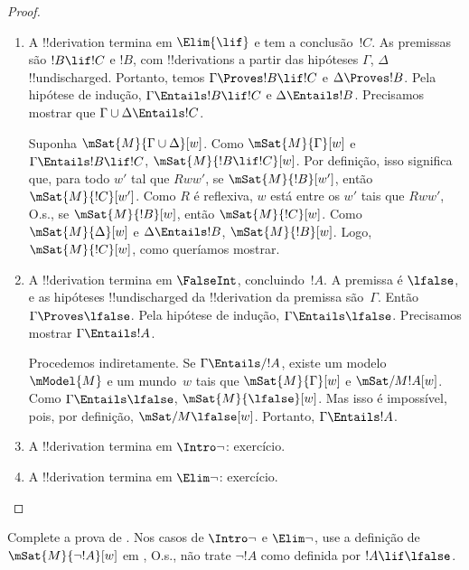 \documentclass[../../../include/open-logic-section]{subfiles}
\begin{document}
\begin{proof}
\begin{enumerate}
    Suponha $\mSat{M}{\Gamma}[w]$. Queremos mostrar que, para todo
    $w'$ tal que $Rww'$, se $\mSat{M}{!B}[w']$, então
    $\mSat{M}{!C}[w']$. Suponha, portanto, $Rww'$ e
    $\mSat{M}{!B}[w']$. Por ,
    $\mSat{M}{\Gamma}[w']$. Como $\Gamma \cup \{!B\} \Entails !C$,
    $\mSat{M}{!C}[w']$, que é o que queríamos mostrar. 

  \item A !!{derivation} termina em $\Elim{\lif}$ e tem a
    conclusão~$!C$. As premissas são $!B \lif !C$ e $!B$, com
    !!{derivation}s a partir das hipóteses $\Gamma$, $\Delta$
    !!{undischarged}. Portanto, temos $\Gamma \Proves !B \lif !C$ e
    $\Delta \Proves !B$. Pela hipótese de indução,
    $\Gamma \Entails !B \lif !C$ e $\Delta \Entails !B$. Precisamos
    mostrar que $\Gamma \cup \Delta \Entails !C$.

    Suponha $\mSat{M}{\Gamma \cup \Delta}[w]$. Como
    $\mSat{M}{\Gamma}[w]$ e $\Gamma \Entails !B \lif !C$,
    $\mSat{M}{!B \lif !C}[w]$. Por definição, isso significa que, para
    todo $w'$ tal que $Rww'$, se $\mSat{M}{!B}[w']$, então
    $\mSat{M}{!C}[w']$. Como $R$ é reflexiva, $w$ está entre os $w'$
    tais que $Rww'$, O.s.\@, se $\mSat{M}{!B}[w]$, então
    $\mSat{M}{!C}[w]$. Como $\mSat{M}{\Delta}[w]$ e
    $\Delta \Entails !B$, $\mSat{M}{!B}[w]$. Logo,
    $\mSat{M}{!C}[w]$, como queríamos mostrar.

  \item A !!{derivation} termina em $\FalseInt$, concluindo~$!A$. A
    premissa é $\lfalse$, e as hipóteses !!{undischarged} da
    !!{derivation} da premissa são~$\Gamma$. Então
    $\Gamma \Proves \lfalse$.
    Pela hipótese de indução, $\Gamma \Entails \lfalse$. Precisamos
    mostrar $\Gamma \Entails !A$.

    Procedemos indiretamente. Se $\Gamma \Entails/ !A$, existe um
    modelo~$\mModel{M}$ e um mundo~$w$ tais que
    $\mSat{M}{\Gamma}[w]$ e $\mSat/{M}{!A}[w]$. Como
    $\Gamma \Entails \lfalse$, $\mSat{M}{\lfalse}[w]$. Mas isso é
    impossível, pois, por definição, $\mSat/{M}{\lfalse}[w]$.
    Portanto, $\Gamma \Entails !A$.
  \item A !!{derivation} termina em $\Intro\lnot$: exercício.
  \item A !!{derivation} termina em $\Elim\lnot$: exercício.
  \end{enumerate}
\end{proof}

\begin{prob}
  Complete a prova de . Nos casos
  de $\Intro\lnot$ e $\Elim\lnot$, use a definição de
  $\mSat{M}{\lnot !A}[w]$ em , O.s.\@, não trate $\lnot !A$ como definida por $!A \lif \lfalse$.
\end{prob}
\end{document}
